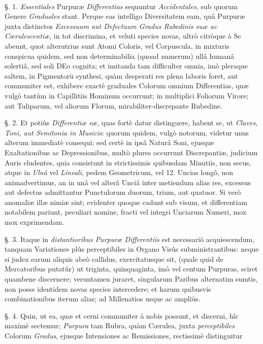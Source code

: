 \documentclass[a4paper, 11pt, oneside, polutonikogreek, german]{article}
\begin{document}
\paragraph{}
§. 1. \emph{Essentiales} Purpuræ \emph{Differentias} sequuntur \emph{Accidentales}, sub quorum Genere \emph{Graduales} stant. Perque eas intelligo Diversitatem eam, quâ Purpuræ juxta distinctos \emph{Excessuum aut Defectuum Gradus Rubedinis suæ ac Cœrulescentiæ}, in tot discrimina, et veluti species novas, ultrò citròque à Se abeunt, quot alterutrius sunt Atomi Coloris, vel Corpuscula, in mixturis conspicua quidem, sed non determinabilia (quoad numerum) ullâ humanâ solertiâ, sed soli DEo cognita; et imitanda tam difficulter omnia, imò pleraque saltem, in Pigmentorū synthesi, quàm desperati res plena laboris foret, aut communiter est, exhibere exactè graduales Colorum omnium Differentias, quæ vulgò tantùm in Capillitiis Hominum occurrunt; in multiplici Foliorum Virore; aut Tuliparum, vel aliorum Florum, mirabiliter-discrepante Rubedine.

§. 2. Et potiùs \emph{Differentiæ eæ}, quas fortè datur distinguere, habent se, ut \emph{Claves, Toni, aut Semitonia in Musicis}: quorum quidem, vulgò notorum, videtur unus alterum immediatè consequi; sed certè in ipsâ Naturâ Soni, ejusque Exaltationibus ac Depressionibus, multò plures occurrunt Discrepantiæ, judicium Auris eludentes, quia consistunt in strictissimis quibusdam Minutiis, non secus, atque in \emph{Ulnâ} vel \emph{Lineali}, pedem Geometricum, vel 12. Uncias longô, non animadvertimus, an in unâ vel alterâ Unciâ inter metiendum alias res, excessus aut defectus admittantur Punctulorum duorum, trium, aut quatuor. Si verò anomaliæ illæ nimiæ sint; evidenter quoque cadunt sub visum, et differentiam notabilem pariunt, peculiari nomine, fracti vel integri Unciarum Numeri, mox mox exprimendam.

§. 3. Itaque in \emph{distantioribus Purpuræ Differentiis} est necessariò acquiescendum, tanquam Variationes plùs perceptibiles in Organo Visûs subministrantibus: neque si judex earum aliquis abeò callidus, exercitatusque sit, (quale quid de Mercatoribus putatûr) ut triginta, quinquaginta, imò vel centum Purpuras, sciret quambene discernere; veruntamen juraret, singularum Paribus alternatim sumtis, non posse identidem novas species intercedere; et harum quibusvis combinationibus iterum alias; ad Millenatios usque ac ampliùs.

§. 4. Quin, ut ea, quæ et cerni communiter à nobis possunt, et discerni, hîc maximè sectemur; \emph{Purpura} tam Rubra, quàm Cœrulea, juxta \emph{perceptibiles} Colorum \emph{Gradus}, ejusque Intensiones ac Remissiones, rectissimè distinguitur
\end{document}
